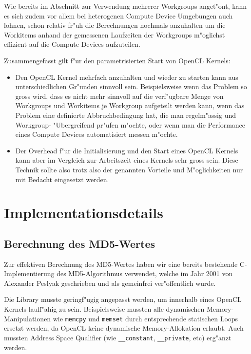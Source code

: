 \begin{refsection}
Wie bereits im Abschnitt zur Verwendung mehrerer Workgroups anget"ont, kann
es sich zudem vor allem bei heterogenen Compute Device Umgebungen auch lohnen,
schon relativ fr"uh die Berechnungen nochmals anzuhalten um die Workitems anhand
der gemessenen Laufzeiten der Workgroups m"oglichst effizient auf die Compute
Devices aufzuteilen.

Zusammengefasst gilt f"ur den parametrisierten Start von OpenCL Kernels:

\begin{itemize}
 \item Den OpenCL Kernel mehrfach anzuhalten und wieder zu starten
       kann aus unterschiedlichen Gr"unden sinnvoll sein. Beispielsweise
       wenn das Problem so gross wird, dass es nicht mehr sinnvoll auf 
       die verf"ugbare Menge von Workgroups und Workitems je Workgroup
       aufgeteilt werden kann, wenn das Problem eine definierte 
       Abbruchbedingung hat, die man regelm"assig und Workgroup-
       "Ubergreifend pr"ufen m"ochte, oder wenn man die Performance eines
			 Compute Devices automatisiert messen m"ochte.
 \item Der Overhead f"ur die Initialisierung und den Start eines OpenCL Kernels
			 kann aber im Vergleich zur Arbeitszeit eines Kernels sehr gross sein. Diese
			 Technik sollte also trotz also der genannten Vorteile und M"oglichkeiten
			 nur mit Bedacht eingesetzt werden.
\end{itemize}


\section{Implementationsdetails}

\subsection{Berechnung des MD5-Wertes}
\label{crypto:md5lib}

Zur effektiven Berechnung des MD5-Wertes haben wir eine bereits bestehende
C-Implementierung des MD5-Algorithmus verwendet\cite{crypto:md5_impl}, welche im
Jahr 2001 von Alexander Peslyak geschrieben und als gemeinfrei ver"offentlich
wurde.

Die Library musste geringf"ugig angepasst werden, um innerhalb eines OpenCL
Kernels lauff"ahig zu sein. Beispielsweise mussten alle dynamischen
Memory-Manipulationen wie \texttt{memcpy} und \texttt{memset} durch
entsprechende statischen Loops ersetzt werden, da OpenCL keine dynamische
Memory-Al\-lo\-ka\-ti\-on erlaubt. Auch mussten Address Space Qualifier (wie
\texttt{\_\_constant}, \texttt{\_\_private}, etc) erg"anzt werden.


\end{refsection}
